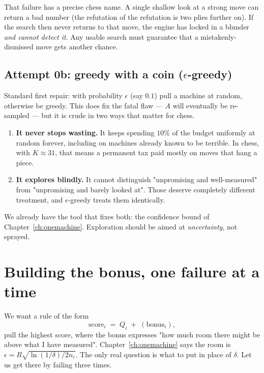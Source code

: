 That failure has a precise chess name. A single shallow look at a strong move can return a
bad number (the refutation of the refutation is two plies further on). If the search then
never returns to that move, the engine has locked in a blunder \emph{and cannot detect it}.
Any usable search must guarantee that a mistakenly-dismissed move gets another chance.

\subsection{Attempt 0b: greedy with a coin ($\epsilon$-greedy)}

Standard first repair: with probability $\epsilon$ (say $0.1$) pull a machine at random,
otherwise be greedy. This does fix the fatal flaw --- $A$ will eventually be re-sampled ---
but it is crude in two ways that matter for chess.

\begin{enumerate}
\item \textbf{It never stops wasting.} It keeps spending $10\%$ of the budget uniformly
  at random forever, including on machines already known to be terrible. In chess, with
  $K\approx31$, that means a permanent tax paid mostly on moves that hang a piece.
\item \textbf{It explores blindly.} It cannot distinguish "unpromising and well-measured"
  from "unpromising and barely looked at". Those deserve completely different treatment,
  and $\epsilon$-greedy treats them identically.
\end{enumerate}

We already have the tool that fixes both: the confidence bound of
Chapter~\ref{ch:onemachine}. Exploration should be aimed at \emph{uncertainty}, not sprayed.

\section{Building the bonus, one failure at a time}

We want a rule of the form
\begin{equation}
  \label{eq:scoreform}
  \text{score}_i \;=\; Q_i \;+\; (\text{bonus}_i),
\end{equation}
pull the highest score, where the bonus expresses "how much room there might be above what
I have measured". Chapter~\ref{ch:onemachine} says the room is $\epsilon = R\sqrt{\ln(1/\delta)/2n_i}$.
The only real question is what to put in place of $\delta$. Let us get there by failing
three times.

